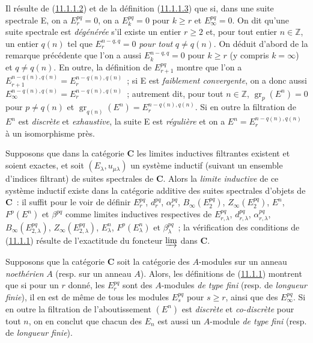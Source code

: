\begin{env}[11.1.6]
\label{0.11.1.6-fr}
Il résulte de (\hyperref[0.11.1.1.2-fr]{11.1.1.2}) et de la définition
(\hyperref[0.11.1.1.3-fr]{11.1.1.3}) que si, dans une suite spectrale E, on a
$E_r^{pq}=0$, on a $E_k^{pq}=0$ pour $k\geq r$ et $E_\infty^{pq}=0$. On dit
qu'une suite spectrale est \emph{dégénérée} s'il existe un entier $r\geq2$ et,
pour tout entier $n\in\mathbb Z$, un entier $q(n)$ tel que
$E_r^{n-q,q}=0$ \emph{pour tout} $q\ne q(n)$. On déduit d'abord de la remarque
précédente que l'on a aussi $E_k^{n-q,q}=0$ pour $k\geq r$ (y compris
$k=\infty$) et $q\ne q(n)$. En outre, la définition de $E_{r+1}^{pq}$ montre
que l'on a
$E_{r+1}^{n-q(n),q(n)}=E_r^{n-q(n),q(n)}$~; si E est \emph{faiblement convergente},
on a donc aussi
$E_\infty^{n-q(n),q(n)}=E_r^{n-q(n),q(n)}$~; autrement dit, pour tout
$n\in\mathbb Z$, $\operatorname{gr}_p(E^n)=0$ pour $p\ne q(n)$ et
$\operatorname{gr}_{q(n)}(E^n)=E_r^{n-q(n),q(n)}$. Si en outre la filtration
de $E^n$ est \emph{discrète} et \emph{exhaustive}, la suite E est \emph{régulière} et on a
$E^n=E_r^{n-q(n),q(n)}$ à un isomorphisme près.
\end{env}

\begin{env}[11.1.7]
\label{0.11.1.7-fr}
Supposons que dans la catégorie $\boldsymbol{C}$ les limites inductives filtrantes
existent et soient exactes, et soit $(E_\lambda,u_{\mu\lambda})$ un système
inductif (suivant un ensemble d'indices filtrant) de suites spectrales de
$\boldsymbol{C}$. Alors la \emph{limite inductive} de ce système inductif existe
dans la catégorie additive des suites spectrales d'objets de $\boldsymbol{C}$~:
il suffit pour le voir de définir $E_r^{pq}$, $d_r^{pq}$, $\alpha_r^{pq}$,
$B_\infty(E_2^{pq})$, $Z_\infty(E_2^{pq})$, $E^n$, $F^p(E^n)$ et
$\beta^{pq}$ comme limites inductives respectives de $E_{r,\lambda}^{pq}$,
$d_{r,\lambda}^{pq}$, $\alpha_{r,\lambda}^{pq}$,
$B_\infty(E_{2,\lambda}^{pq})$, $Z_\infty(E_{2,\lambda}^{pq})$,
$E_\lambda^n$, $F^p(E_\lambda^n)$ et $\beta_\lambda^{pq}$~; la vérification
des conditions de (\hyperref[0.11.1.1-fr]{11.1.1}) résulte de l'exactitude du
foncteur $\varinjlim$ dans $\boldsymbol{C}$.
\end{env}

\begin{remark}[11.1.8]
\label{0.11.1.8-fr}
Supposons que la catégorie $\boldsymbol{C}$ soit la catégorie des $A$-modules sur
un anneau \emph{noethérien} $A$ (resp. sur un anneau $A$). Alors, les
définitions de (\hyperref[0.11.1.1-fr]{11.1.1}) montrent que si pour un $r$
donné, les $E_r^{pq}$ sont des $A$-modules \emph{de type fini} (resp. de
\emph{longueur finie}), il en est de même de tous les modules $E_s^{pq}$ pour
$s\geq r$, ainsi que des $E_\infty^{pq}$. Si en outre la filtration de
l'aboutissement $(E^n)$ est \emph{discrète} et \emph{co-discrète} pour tout $n$, on en
conclut que chacun des $E_n$ est aussi un $A$-module \emph{de type fini}
(resp. de \emph{longueur finie}).
\end{remark}

